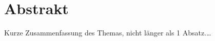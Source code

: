 

\begingroup
\let\clearpage\relax
\let\cleardoublepage\relax
\let\cleardoublepage\relax

\chapter*{Abstrakt} %

Kurze Zusammenfassung des Themas, nicht länger als 1 Absatz.\dots

\endgroup

\vfill

